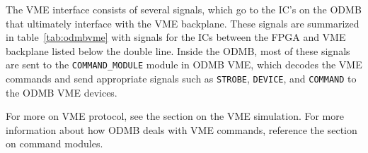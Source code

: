 \documentclass[10pt,a4paper]{article}
\begin{document}
The VME interface consists of several signals, which go to the IC's on the ODMB that ultimately interface with the VME backplane. These signals are summarized in table~\ref{tab:odmbvme} with signals for the ICs between the FPGA and VME backplane listed below the double line. Inside the ODMB, most of these signals are sent to the \texttt{COMMAND\_MODULE} module in ODMB VME, which decodes the VME commands and send appropriate signals such as \texttt{STROBE}, \texttt{DEVICE}, and \texttt{COMMAND} to the ODMB VME devices. 

For more on VME protocol, see the section on the VME simulation. For more information about how ODMB deals with VME commands, reference the section on command modules. 
\end{document}
